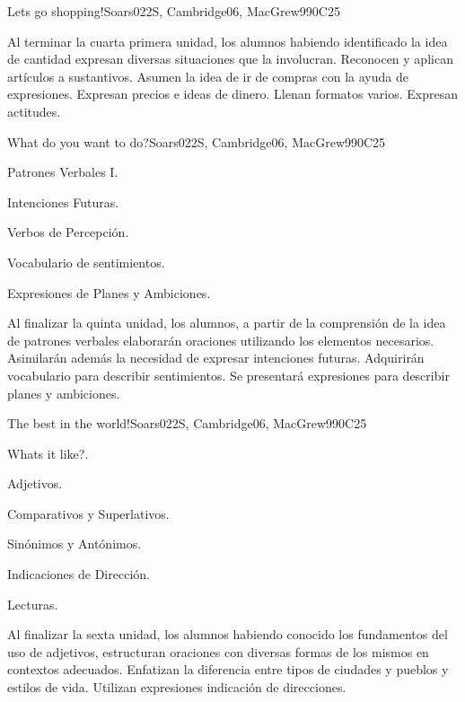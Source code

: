 \begin{syllabus}
\begin{unit}{Lets go shopping!}{}{Soars022S, Cambridge06, MacGrew99}{0}{C25}
   \begin{learningoutcomes}
      \item Al terminar la cuarta primera unidad, los alumnos habiendo identificado la idea de cantidad expresan diversas situaciones que la involucran. Reconocen y aplican artículos a sustantivos. Asumen la idea de ir de compras con la ayuda de expresiones. Expresan precios e ideas de dinero. Llenan formatos varios. Expresan actitudes.
   \end{learningoutcomes}
\end{unit}

\begin{unit}{What do you want to do?}{}{Soars022S, Cambridge06, MacGrew99}{0}{C25}
   \begin{topics}
      \item Patrones Verbales I.
      \item Intenciones Futuras.
      \item Verbos de Percepción.
      \item Vocabulario de sentimientos.
      \item Expresiones de Planes y Ambiciones.
   \end{topics}

   \begin{learningoutcomes}
      \item Al finalizar la quinta unidad, los alumnos, a partir de la comprensión de la idea de patrones verbales elaborarán oraciones utilizando los elementos necesarios. Asimilarán además la necesidad de expresar intenciones futuras. Adquirirán vocabulario para describir sentimientos. Se presentará expresiones para describir planes y ambiciones.
   \end{learningoutcomes}
\end{unit}

\begin{unit}{The best in the world!}{}{Soars022S, Cambridge06, MacGrew99}{0}{C25}
   \begin{topics}
      \item Whats it like?.
      \item Adjetivos.
      \item Comparativos y Superlativos.
      \item Sinónimos y Antónimos. 
      \item Indicaciones de Dirección.
      \item Lecturas.
   \end{topics}

   \begin{learningoutcomes}
      \item Al finalizar la sexta unidad, los alumnos habiendo conocido los fundamentos del uso de adjetivos, estructuran oraciones con diversas formas de los mismos en contextos adecuados. Enfatizan la diferencia entre tipos de ciudades y pueblos y estilos de vida. Utilizan expresiones indicación de direcciones.
   \end{learningoutcomes}
\end{unit}


\end{syllabus}
